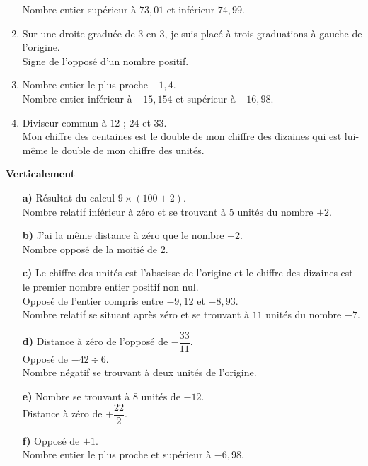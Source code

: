 \begin{enigme}
\begin{multicols}{2}
\begin{enumerate}
         Nombre entier supérieur à $73,01$ et inférieur $74,99$. \\
      \item Sur une droite graduée de $3$ en $3$, je suis placé à trois graduations à gauche de l'origine. \\
         Signe de l’opposé d'un nombre positif. \\
      \item Nombre entier le plus proche $-1,4$. \\
         Nombre entier inférieur à $-15,154$ et supérieur à $-16,98$. \\
      \item Diviseur commun à $12$ ; $24$ et $33$. \\
         Mon chiffre des centaines est le double de mon chiffre des dizaines qui est lui-même le double de mon chiffre des unités. \\ [1mm]
      \end{enumerate}
      
   {\bf Verticalement} \\
   \begin{enumerate}
      \item[\textcolor{B1}{\bf a)}] Résultat du calcul $9\times(100+2)$. \\
         Nombre relatif inférieur à zéro et se trouvant à 5 unités du nombre $+2$. \\
      \item[\textcolor{B1}{\bf b)}] J'ai la même distance à zéro que le nombre $-2$. \\
         Nombre opposé de la moitié de 2. \\
      \item[\textcolor{B1}{\bf c)}] Le chiffre des unités est l'abscisse de l'origine et le chiffre des dizaines est le premier nombre entier positif non nul. \\
         Opposé de l'entier compris entre $-9,12$ et $-8,93$. \\
         Nombre relatif se situant après zéro et se trouvant à $11$ unités du nombre $-7$. \\
      \item[\textcolor{B1}{\bf d)}] Distance à zéro de l'opposé de $-\dfrac{33}{11}$. \\ [1mm]
         Opposé de $-42\div6$. \\
         Nombre négatif se trouvant à deux unités de l'origine. \\
      \item[\textcolor{B1}{\bf e)}] Nombre se trouvant à 8 unités de $-12$. \\ [1mm]
         Distance à zéro de $+\dfrac{22}{2}$. \\
      \item[\textcolor{B1}{\bf f)}] Opposé de $+1$. \\
         Nombre entier le plus proche et supérieur à $-6,98$.
   \end{enumerate}
\end{multicols}
\end{enigme}

